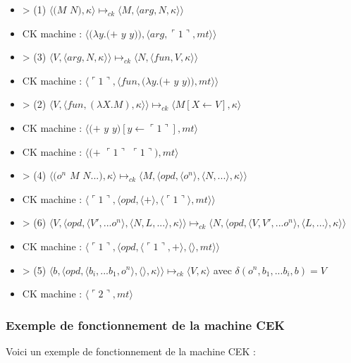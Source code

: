 \documentclass[10pt,a4paper]{report}
\begin{document}
\begin{itemize}
\item[] > (1) $\langle(M$ $N),\kappa\rangle \longmapsto_{ck} \langle M,\langle arg,N,\kappa\rangle\rangle$
\item[] CK machine : $\langle(\lambda y.(+$ $y$ $y)),\langle arg,\ulcorner 1\urcorner,mt\rangle\rangle$	
\item[] > (3) $\langle V,\langle arg,N,\kappa \rangle \rangle \longmapsto_{ck} \langle N,\langle fun,V,\kappa \rangle \rangle$
\item[] CK machine : $\langle\ulcorner 1\urcorner,\langle fun,(\lambda y.(+$ $y$ $y)),mt\rangle\rangle$	
\item[] > (2) $\langle V,\langle fun,(\lambda X.M),\kappa \rangle \rangle \longmapsto_{ck} \langle M[X \leftarrow V],\kappa\rangle$	
\item[] CK machine : $\langle(+$ $y$ $y)[y \leftarrow\ulcorner 1\urcorner],mt\rangle$
\item[] CK machine : $\langle(+$ $\ulcorner 1\urcorner$ $\ulcorner 1\urcorner),mt\rangle$
\item[] > (4) $\langle(o^{n}$ $M$ $N...),\kappa\rangle \longmapsto_{ck} \langle M,\langle opd,\langle o^{n}\rangle,\langle N,...\rangle,\kappa\rangle\rangle$
\item[] CK machine : $\langle\ulcorner 1\urcorner,\langle opd,\langle + \rangle,\langle\ulcorner 1\urcorner\rangle,mt\rangle\rangle$
\item[] > (6) $\langle V,\langle opd,\langle V',...o^{n}\rangle,\langle N,L,...\rangle,\kappa\rangle\rangle \longmapsto_{ck} \langle N,\langle opd,\langle V,V',...o^{n}\rangle,\langle L,...\rangle,\kappa\rangle\rangle$
\item[] CK machine : $\langle\ulcorner 1\urcorner,\langle opd,\langle\ulcorner 1\urcorner,+ \rangle,\langle\rangle,mt\rangle\rangle$
\item[] > (5) $\langle b,\langle opd,\langle b_{i},...b_{1},o^{n}\rangle,\langle\rangle,\kappa\rangle\rangle \longmapsto_{ck} \langle V,\kappa\rangle$ avec $\delta(o^{n},b_{1},...b_{i},b) = V$
\item[] CK machine : $\langle\ulcorner 2\urcorner,mt\rangle$
\end{itemize}
\newpage



\subsubsection{Exemple de fonctionnement de la machine CEK}\label{CEK}

Voici un exemple de fonctionnement de la machine CEK :
\end{document}
